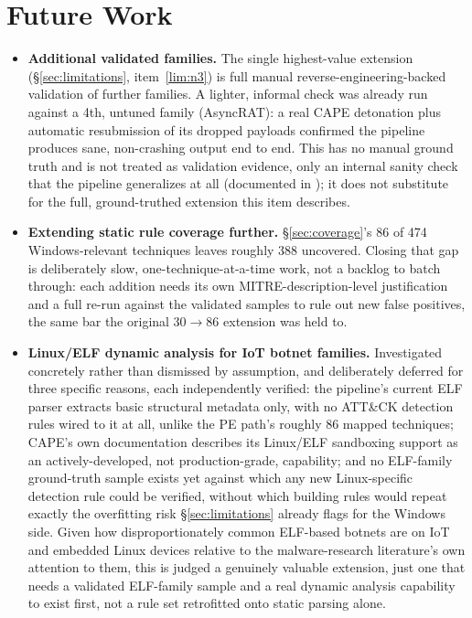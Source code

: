 \section{Future Work}
\label{sec:future-work}

\begin{itemize}

\item \textbf{Additional validated families.} The single highest-value
  extension (\S\ref{sec:limitations}, item~\ref{lim:n3}) is full manual
  reverse-engineering-backed validation of further families. A lighter,
  informal check was already run against a 4th, untuned family
  (AsyncRAT): a real CAPE detonation plus automatic resubmission of its
  dropped payloads confirmed the pipeline produces sane, non-crashing
  output end to end. This has no manual ground truth and is not treated
  as validation evidence, only an internal sanity check that the
  pipeline generalizes at all (documented in ); it does
  not substitute for the full, ground-truthed extension this item
  describes.

\item \textbf{Extending static rule coverage further.}
  \S\ref{sec:coverage}'s 86 of 474 Windows-relevant techniques leaves
  roughly 388 uncovered. Closing that gap is deliberately slow,
  one-technique-at-a-time work, not a backlog to batch through: each
  addition needs its own MITRE-description-level justification and a
  full re-run against the validated samples to rule out new false
  positives, the same bar the original 30$\to$86 extension was held to.

\item \textbf{Linux/ELF dynamic analysis for IoT botnet families.}
  Investigated concretely rather than dismissed by assumption, and
  deliberately deferred for three specific reasons, each independently
  verified: the pipeline's current ELF parser extracts basic structural
  metadata only, with no ATT\&CK detection rules wired to it at all,
  unlike the PE path's roughly 86 mapped techniques; CAPE's own
  documentation describes its Linux/ELF sandboxing support as an
  actively-developed, not production-grade, capability; and no
  ELF-family ground-truth sample exists yet against which any new
  Linux-specific detection rule could be verified, without which
  building rules would repeat exactly the overfitting risk
  \S\ref{sec:limitations} already flags for the Windows side. Given how
  disproportionately common ELF-based botnets are on IoT and embedded
  Linux devices relative to the malware-research literature's own
  attention to them, this is judged a genuinely valuable extension,
  just one that needs a validated ELF-family sample and a real dynamic
  analysis capability to exist first, not a rule set retrofitted onto
  static parsing alone.


\end{itemize}
